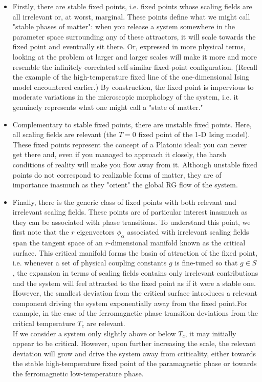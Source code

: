 \documentclass[cyan]{elegantnote}
\begin{document}
\begin{itemize}
\item Firstly, there are stable fixed points, i.e. fixed points whose scaling fields are all irrelevant or, at worst, marginal. 
These points define what we might call "stable phases of
matter": when you release a system somewhere in the parameter space surrounding any of these attractors, it will scale towards the fixed point and eventually sit there. Or,
expressed in more physical terms, looking at the problem at larger and larger scales will make it more and more resemble the infinitely correlated self-similar fixed-point configuration. (Recall the example of the high-temperature fixed line of the one-dimensional Ising
model encountered earlier.) 
By construction, the fixed point is impervious to moderate
variations in the microscopic morphology of the system, i.e. it genuinely represents what one might call a "state of matter."
\item Complementary to stable fixed points, there are unstable fixed points. Here, all scaling fields are relevant (the $T = 0$ fixed point of the 1-D Ising model). These fixed points represent the concept of a Platonic ideal: you can never get there and, even if you managed to approach it closely, the harsh conditions of reality will make you flow away from it.
Although unstable fixed points do not correspond to realizable forms of matter, they are of importance inasmuch as they "orient" the global RG flow of the system.
\item Finally, there is the generic class of fixed points with both relevant and irrelevant scaling fields. These points are of particular interest inasmuch as they can be associated with phase transitions. 
To understand this point, we first note that the $r$ eigenvectors $\phi_{\alpha}$ associated with irrelevant scaling fields span the tangent space of an $r$-dimensional
manifold known as the critical surface. 
This critical manifold forms the basin of attraction of the fixed point, i.e. whenever a set of physical coupling constants $g$ is fine-tuned so that $g \in S$, the
expansion in terms of scaling fields contains only irrelevant contributions and the system will feel attracted to the fixed point as if it were a stable one.
\\
However, the smallest deviation from the critical surface introduces a relevant component driving the system exponentially away from the fixed point.For example, in the
case of the ferromagnetic phase transition  deviations from the critical temperature $T_c$ are relevant. 
\\
If we consider a system only slightly above or below $T_c$, it may initially appear to be critical. However, upon further increasing the scale, the relevant deviation will grow and drive the system away from criticality, either towards the stable high-temperature fixed point of the paramagnetic phase or towards the ferromagnetic low-temperature phase.
\end{itemize}
\end{document}
